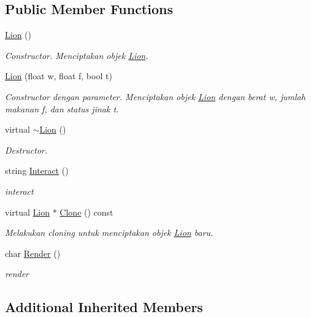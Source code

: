 \subsection*{Public Member Functions}
\begin{DoxyCompactItemize}
\item 
\hyperlink{classLion_a582202364024a9ce10e57f47c872dbc2}{Lion} ()
\begin{DoxyCompactList}\small\item\em Constructor. Menciptakan objek \hyperlink{classLion}{Lion}. \end{DoxyCompactList}\item 
\hyperlink{classLion_a5bc46f23f72bc31fe8ef58db40a62b58}{Lion} (float w, float f, bool t)
\begin{DoxyCompactList}\small\item\em Constructor dengan parameter. Menciptakan objek \hyperlink{classLion}{Lion} dengan berat w, jumlah makanan f, dan status jinak t. \end{DoxyCompactList}\item 
virtual \hyperlink{classLion_a09c9c113e6ca2d7c7b304b009d61dc62}{$\sim$\+Lion} ()
\begin{DoxyCompactList}\small\item\em Destructor. \end{DoxyCompactList}\item 
string \hyperlink{classLion_a4c090a9b5f42b92c30d223b40435e167}{Interact} ()
\begin{DoxyCompactList}\small\item\em interact \end{DoxyCompactList}\item 
virtual \hyperlink{classLion}{Lion} $\ast$ \hyperlink{classLion_ae63405ef106650644a8fcafc7393284e}{Clone} () const 
\begin{DoxyCompactList}\small\item\em Melakukan cloning untuk menciptakan objek \hyperlink{classLion}{Lion} baru. \end{DoxyCompactList}\item 
char \hyperlink{classLion_ad782de7c88e4a7aad01287a2ed64827c}{Render} ()
\begin{DoxyCompactList}\small\item\em render \end{DoxyCompactList}\end{DoxyCompactItemize}
\subsection*{Additional Inherited Members}


